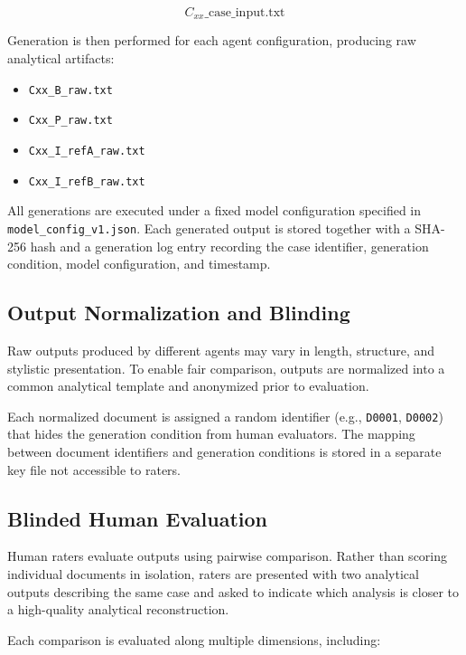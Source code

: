 \[
C_{xx}\_\text{case\_input.txt}
\]

Generation is then performed for each agent configuration, producing raw
analytical artifacts:

\begin{itemize}

\item \texttt{Cxx\_B\_raw.txt}

\item \texttt{Cxx\_P\_raw.txt}

\item \texttt{Cxx\_I\_refA\_raw.txt}

\item \texttt{Cxx\_I\_refB\_raw.txt}

\end{itemize}

All generations are executed under a fixed model configuration specified in
\texttt{model\_config\_v1.json}. Each generated output is stored together
with a SHA-256 hash and a generation log entry recording the case
identifier, generation condition, model configuration, and timestamp.

\subsection{Output Normalization and Blinding}

Raw outputs produced by different agents may vary in length, structure, and
stylistic presentation. To enable fair comparison, outputs are normalized
into a common analytical template and anonymized prior to evaluation.

Each normalized document is assigned a random identifier (e.g.,
\texttt{D0001}, \texttt{D0002}) that hides the generation condition from
human evaluators. The mapping between document identifiers and generation
conditions is stored in a separate key file not accessible to raters.

\subsection{Blinded Human Evaluation}

Human raters evaluate outputs using pairwise comparison. Rather than
scoring individual documents in isolation, raters are presented with two
analytical outputs describing the same case and asked to indicate which
analysis is closer to a high-quality analytical reconstruction.

Each comparison is evaluated along multiple dimensions, including:

